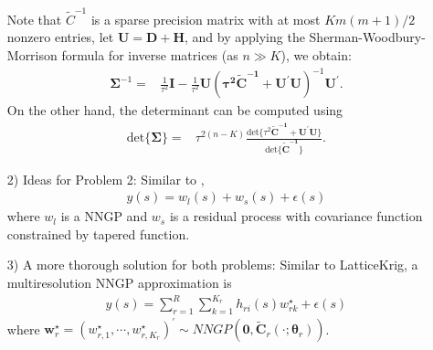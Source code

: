 \documentclass[
12pt, %
a4paper, %
oneside, %
headinclude,footinclude, %
BCOR5mm, %
]{scrartcl}
\begin{document}
\begin{itemize}
Note that $\tilde{C}^{-1}$ is a sparse precision matrix with at most $Km(m + 1)/2$ nonzero entries, let $\boldsymbol{U} = \boldsymbol{D} + \boldsymbol{H}$, and by applying the Sherman-Woodbury-Morrison formula for inverse matrices (as $n \gg K$), we obtain:
\begin{equation}
\begin{aligned}
  \boldsymbol{\Sigma}^{-1} = & \frac{1}{\tau^2}\boldsymbol{I} - \frac{1}{\tau^2}\boldsymbol{U}
  \left(\boldsymbol{\tau^2\tilde{C}^{-1}} + \boldsymbol{U}^\prime\boldsymbol{U}\right)^{-1}\boldsymbol{U}^\prime.
\end{aligned}
\end{equation}
On the other hand, the determinant can be computed using
\begin{equation}
\begin{aligned}
  \text{det}\{\boldsymbol{\Sigma}\} = &  \tau^{2(n - K)} \frac{\text{det}\{\tau^2\boldsymbol{\tilde{C}^{-1}} +  \boldsymbol{U}^\prime\boldsymbol{U}\}}{\text{det}\{\boldsymbol{\tilde{C}^{-1}}\}}.
\end{aligned}
\end{equation}

 \item [2)] Ideas for Problem 2: Similar to \href{https://chenyw68.github.io/Literature/[2012]A full scale approximation of covariance functions for large spatial data sets.pdf}{\cite{sang2012full}},
\begin{equation}
    \begin{aligned}
       y(s) = w_l(s) + w_s(s) + \epsilon(s)
    \end{aligned} \label{DP1}
\end{equation}
where $w_l$ is a NNGP and $w_s$ is a residual process with covariance function constrained by tapered function.
 \item [3)] A more thorough solution for both problems: Similar to LatticeKrig, a multiresolution NNGP approximation is
 \begin{equation}
\begin{aligned}
y(s) = \sum_{r = 1}^{R}\sum_{k = 1}^{K_r}h_{ri}(s)w_{rk}^{\star}  + \epsilon(s)
\end{aligned} \label{DP1}
\end{equation}
where $\boldsymbol{w}_r^{\star} = \left(w_{r, 1}^{\star}, \cdots, w_{r, K_r}^{\star}\right)^\prime \sim NNGP\left(\boldsymbol{0}, \boldsymbol{\tilde{C}}_r(\cdot; \boldsymbol{\theta}_r)\right)$.
\end{itemize}

%

\end{document}

